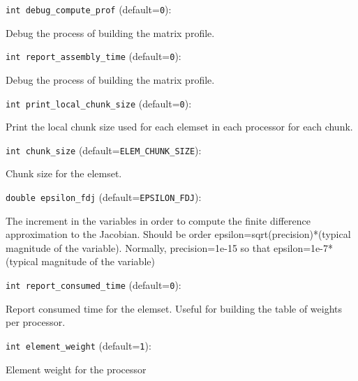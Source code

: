 \item\verb+int debug_compute_prof+ {\rm(default=\verb|0|)}:

Debug the process of building the matrix profile. 

\item\verb+int report_assembly_time+ {\rm(default=\verb|0|)}:

Debug the process of building the matrix profile. 

\item\verb+int print_local_chunk_size+ {\rm(default=\verb|0|)}:

Print the local chunk size used for each elemset in each
processor for each chunk. 

\item\verb+int chunk_size+ {\rm(default=\verb|ELEM_CHUNK_SIZE|)}:

Chunk size for the elemset. 

\item\verb+double epsilon_fdj+ {\rm(default=\verb|EPSILON_FDJ|)}:

The increment in the variables in order to
compute the finite difference approximation to the
Jacobian. Should be order epsilon=sqrt(precision)*(typical
magnitude of the variable). Normally, precision=1e-15 so
that epsilon=1e-7*(typical magnitude of the
variable)

\item\verb+int report_consumed_time+ {\rm(default=\verb|0|)}:

Report consumed time for the elemset. Useful for building
the table of weights per processor. 

\item\verb+int element_weight+ {\rm(default=\verb|1|)}:

Element weight for the processor

